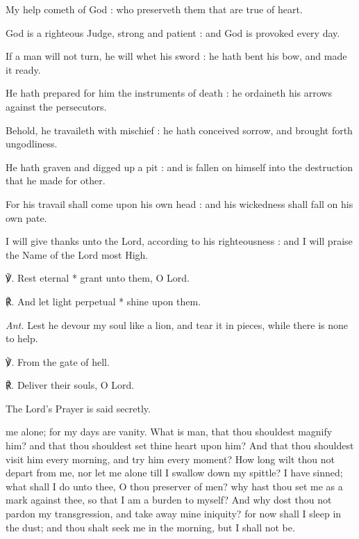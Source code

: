 My help cometh of God : who preserveth them that are true of heart.\par
{}God is a righteous Judge, strong and patient : and God is provoked every day.\par
{}If a man will not turn, he will whet his sword : he hath bent his bow, and made it ready.\par
{}He hath prepared for him the instruments of death : he ordaineth his arrows against the persecutors.\par
{}Behold, he travaileth with mischief : he hath conceived sorrow, and brought forth ungodliness.\par
{}He hath graven and digged up a pit : and is fallen on himself into the destruction that he made for other.\par
{}For his travail shall come upon his own head : and his wickedness shall fall on his own pate.\par
{}I will give thanks unto the Lord, according to his righteousness : and I will praise the Name of the Lord most High.\par
℣. Rest eternal * grant unto them, O Lord.\par
℟. And let light perpetual * shine upon them.\par\noindent
\textit{Ant.} Lest he devour my soul like a lion, and tear it in pieces, while there is none to help.\par
\vspace{0.5\baselineskip}
℣. From the gate of hell.\par
℟. Deliver their souls, O Lord.\par
\begin{rubric}
    {The Lord's Prayer is said secretly.}
\end{rubric}
 me alone; for my days are vanity. What is man, that thou shouldest magnify him? and that thou shouldest set thine heart upon him? And that thou shouldest visit him every morning, and try him every moment? How long wilt thou not depart from me, nor let me alone till I swallow down my spittle? I have sinned; what shall I do unto thee, O thou preserver of men? why hast thou set me as a mark against thee, so that I am a burden to myself? And why dost thou not pardon my transgression, and take away mine iniquity? for now shall I sleep in the dust; and thou shalt seek me in the morning, but I shall not be.
